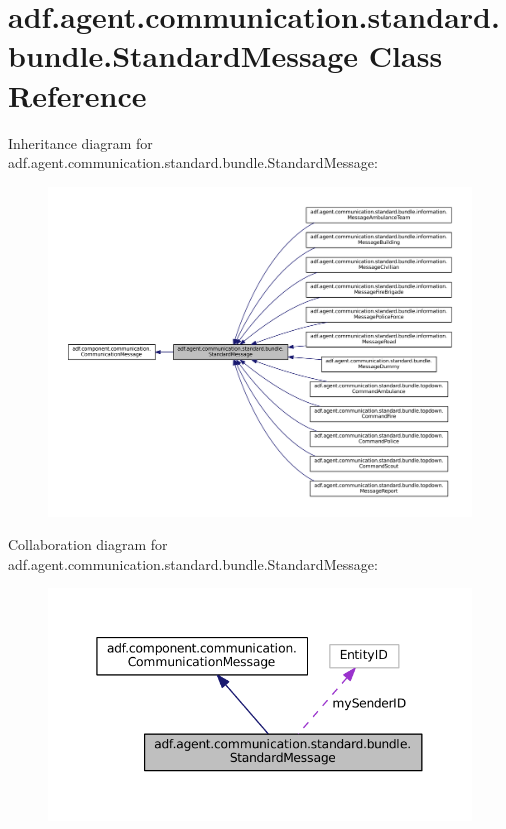 \hypertarget{classadf_1_1agent_1_1communication_1_1standard_1_1bundle_1_1StandardMessage}{}\section{adf.\+agent.\+communication.\+standard.\+bundle.\+Standard\+Message Class Reference}
\label{classadf_1_1agent_1_1communication_1_1standard_1_1bundle_1_1StandardMessage}


Inheritance diagram for adf.\+agent.\+communication.\+standard.\+bundle.\+Standard\+Message\+:
\nopagebreak
\begin{figure}[H]
\begin{center}
\leavevmode
\includegraphics[width=350pt]{classadf_1_1agent_1_1communication_1_1standard_1_1bundle_1_1StandardMessage__inherit__graph}
\end{center}
\end{figure}


Collaboration diagram for adf.\+agent.\+communication.\+standard.\+bundle.\+Standard\+Message\+:
\nopagebreak
\begin{figure}[H]
\begin{center}
\leavevmode
\includegraphics[width=345pt]{classadf_1_1agent_1_1communication_1_1standard_1_1bundle_1_1StandardMessage__coll__graph}
\end{center}
\end{figure}
